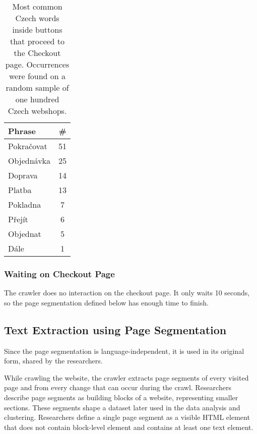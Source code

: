             \begin{table}[h!]
                \centering
                \begin{tabular}{l | c} 
                \textbf{Phrase} & \textbf{\#} \\ [0.5ex] 
                \hline
                Pokračovat & 51 \\ \hline
                Objednávka & 25 \\ \hline
                Doprava & 14 \\ \hline
                Platba & 13 \\ \hline
                Pokladna & 7 \\ \hline
                Přejít & 6 \\ \hline
                Objednat & 5 \\ \hline
                Dále & 1 \\ [1ex] 
                \end{tabular}
                \caption{Most common Czech words inside buttons that proceed to the Checkout page. Occurrences were found on a random sample of one hundred Czech webshops.}
                \label{table:add-to-cart-phrases}
            \end{table}

        \subsubsection{Waiting on Checkout Page}
            The crawler does no interaction on the checkout page. It only waits 10 seconds, so the page segmentation defined below has enough time to finish.

        \subsection{Text Extraction using Page Segmentation}
        \label{section:text-extraction}
        Since the page segmentation is language-independent, it is used in its original form, shared by the researchers. 
        
        While crawling the website, the crawler extracts page segments of every visited page and from every change that can occur during the crawl. Researchers describe page segments as building blocks of a website, representing smaller sections. These segments shape a dataset later used in the data analysis and clustering. Researchers define\cite{dark-patterns-at-scale} a single page segment as a visible HTML element that does not contain block-level element\cite{block-element} and contains at least one text element\cite{text-element}. 
        
